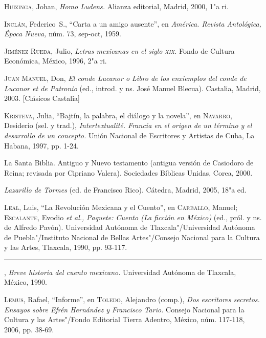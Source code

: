 \documentclass[14pt,twoside,final]{extbook} %
\begin{document}
\textsc{Huizinga}, Johan, \emph{Homo Ludens.} Alianza editorial, Madrid, 2000, 1"a ri.\label{bib:huizinga2000}

\textsc{Inclán}, Federico~S., ``Carta a un amigo ausente'', en \emph{América. Revista Antológica, Época Nueva,} núm. 73, sep-oct, 1959.\label{bib:inclan1959}

\textsc{Jiménez Rueda}, Julio, \emph{Letras mexicanas en el siglo \textsc{xix}.} Fondo de Cultura Económica, México, 1996, 2"a ri.\label{bib:jimenez1996}

\textsc{Juan Manuel}, Don, \emph{El conde Lucanor o Libro de los enxiemplos del conde de Lucanor et de Patronio} (ed., introd. y ns. José Manuel Blecua). Castalia, Madrid, 2003. [Clásicos Castalia]\label{bib:juanmanuel2003}

\textsc{Kristeva}, Julia, ``Bajtín, la palabra, el diálogo y la novela'', en \textsc{Navarro}, Desiderio (sel. y trad.), \emph{Intertextualité. Francia en el origen de un término y el desarrollo de un concepto.} Unión Nacional de Escritores y Artistas de Cuba, La Habana, 1997, pp. 1-24.\label{bib:kristeva1997}

La Santa Biblia. Antiguo y Nuevo testamento (antigua versión de Casiodoro de Reina; revisada por Cipriano Valera). Sociedades Bíblicas Unidas, Corea, 2000.\label{bib:biblia2000}

\emph{Lazarillo de Tormes} (ed. de Francisco Rico). Cátedra, Madrid, 2005, 18"a ed.\label{bib:lazarillo2005}

\textsc{Leal}, Luis, ``La Revolución Mexicana y el Cuento'', en \textsc{Carballo}, Manuel; \textsc{Escalante}, Evodio \emph{et al.,} \emph{Paquete: Cuento (La ficción en México)} (ed., pról. y ns. de Alfredo Pavón). Universidad Autónoma de Tlaxcala"/Universidad Autónoma de Puebla"/Instituto Nacional de Bellas Artes"/Consejo Nacional para la Cultura y las Artes, Tlaxcala, 1990, pp. 93-117.\label{bib:leal1990a}

\rule{1cm}{0.4pt}, \emph{Breve historia del cuento mexicano.} Universidad Autónoma de Tlaxcala, México, 1990.\label{bib:leal1990b}

\textsc{Lemus}, Rafael, ``Informe'', en \textsc{Toledo}, Alejandro (comp.), \emph{Dos escritores secretos. Ensayos sobre Efrén Hernández y Francisco Tario.} Consejo Nacional para la Cultura y las Artes"/Fondo Editorial Tierra Adentro, México, núm. 117-118, 2006, pp. 38-69.\label{bib:lemus2006}
\end{document}
